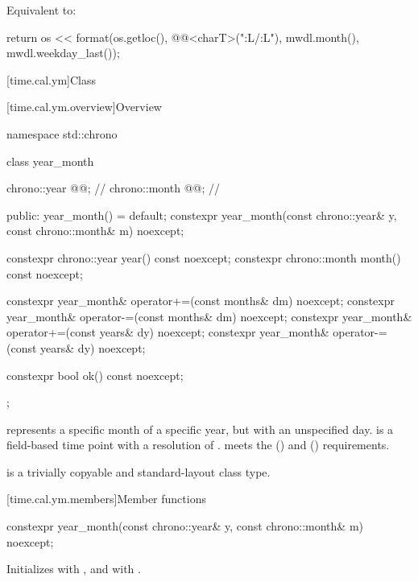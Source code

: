 \begin{itemdescr}
\pnum
\effects
Equivalent to:
\begin{codeblock}
return os << format(os.getloc(), @@<charT>("{:L}/{:L}"),
                    mwdl.month(), mwdl.weekday_last());
\end{codeblock}
\end{itemdescr}

[time.cal.ym]{Class }

[time.cal.ym.overview]{Overview}

\begin{codeblock}
namespace std::chrono {
  class year_month {
    chrono::year  @@;           // \expos
    chrono::month @@;           // \expos

  public:
    year_month() = default;
    constexpr year_month(const chrono::year& y, const chrono::month& m) noexcept;

    constexpr chrono::year  year()  const noexcept;
    constexpr chrono::month month() const noexcept;

    constexpr year_month& operator+=(const months& dm) noexcept;
    constexpr year_month& operator-=(const months& dm) noexcept;
    constexpr year_month& operator+=(const years& dy)  noexcept;
    constexpr year_month& operator-=(const years& dy)  noexcept;

    constexpr bool ok() const noexcept;
  };
}
\end{codeblock}

\pnum
{} represents a specific month of a specific year,
but with an unspecified day.
 is a field-based time point with a resolution of .
 meets the  ()
and  () requirements.

\pnum
{} is a trivially copyable and standard-layout class type.

[time.cal.ym.members]{Member functions}

%
\begin{itemdecl}
constexpr year_month(const chrono::year& y, const chrono::month& m) noexcept;
\end{itemdecl}

\begin{itemdescr}
\pnum
\effects
Initializes  with , and  with .
\end{itemdescr}

